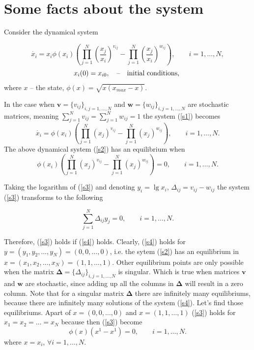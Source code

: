 \documentclass[a4paper,10pt, english]{article}
\newcommand{\D}{\displaystyle}
\begin{document}
\section{Some facts about the system}

Consider the dynamical system 

\begin{equation}
\label{s1}
\D
\dot{x_i} = x_i \phi(x_i)\left(\prod_{j=1}^{N} \left(\frac{x_j}{x_i}\right)^{v_{ij}} - \prod_{j=1}^{N}\left(\frac{x_j}{x_i}\right)^{w_{ij}} \right), \qquad i=1,\ldots, N,
\end{equation}
$$
x_i(0) = x_{i0}, \quad \mbox{\---} \quad \mbox{initial conditions, }
$$
where $x$ \--- the state, $\phi(x) = \sqrt{x(x_{max}-x)}$. 

In the case when $\mathbf{v} = \{v_{ij}\}_{i,j=1, \ldots, N}$ and $\mathbf{w} = \{w_{ij}\}_{i,j=1, \ldots, N}$ are stochastic matrices, meaning $\sum_{j=1}^{N}v_{ij} = \sum_{j=1}^{N}w_{ij} = 1$ the system (\ref{s1}) becomes
\begin{equation}
\label{s2}
\D
\dot{x_i}  = \phi(x_i)\left(\prod_{j=1}^{N} \left(x_j\right)^{v_{ij}} - \prod_{j=1}^{N}\left(x_j\right)^{w_{ij}} \right), \qquad i=1,\ldots, N.
\end{equation}
The above dynamical system (\ref{s2}) has an equilibrium when
\begin{equation}
\label{s3}
\D
 \phi(x_i)\left(\prod_{j=1}^{N} \left(x_j\right)^{v_{ij}} - \prod_{j=1}^{N}\left(x_j\right)^{w_{ij}} \right) = 0, \qquad i=1,\ldots, N.
\end{equation}

Taking the logarithm of (\ref{s3}) and denoting $y_i = \lg{x_i}$, $\Delta_{ij} = v_{ij} - w_{ij}$ the system (\ref{s3}) transforms to the following

\begin{equation}
\label{s4}
\D
\sum_{j=1}^{N}\Delta_{ij}y_j = 0, \qquad i=1,\ldots, N.
\end{equation}

Therefore, (\ref{s3}) holds if  (\ref{s4}) holds. Clearly, (\ref{s4}) holds for $y=(y_1, y_2, \ldots, y_N) = (0, 0, \ldots, 0)$, i.e. the sytem (\ref{s2}) has an equilibrium in 
$x=(x_1, x_2, \ldots, x_N) = (1, 1, \ldots, 1)$. Other equilibrium points are only possible when the matrix $\mathbf{\Delta} = \{\Delta_{ij}\}_{i,j=1, \ldots, N}$ is singular.
Which is true when matrices $\mathbf{v}$ and $\mathbf{w}$ are stochastic, since adding up all the columns in $\mathbf{\Delta}$ will result in a zero column.
Note that for a singular matrix $\mathbf{\Delta}$ there are infinitely many equilibriums, because there are infinitely many solutions of the system (\ref{s4}). 
Let's find those equilibriums. Apart of  $x = (0, 0, \ldots, 0)$ and $x = (1, 1, \ldots, 1)$ (\ref{s3}) holds for $x_1 =  x_2 = \ldots = x_N$ because then (\ref{s3}) become
$$
\D
 \phi(x)\left(x^1 - x^1\right) = 0, \qquad i=1,\ldots, N.
$$
where $x = x_i$, $\forall i=1,\ldots, N$.
\end{document}
